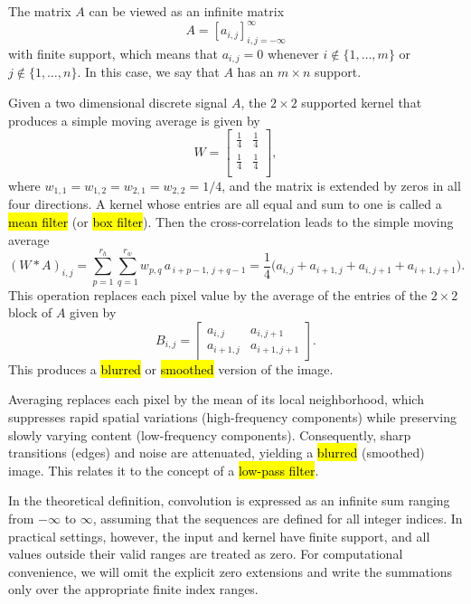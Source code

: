 \begin{remark}
The matrix $A$ can be viewed as an infinite matrix 
$$
A = [a_{i,j}]_{i,j=-\infty}^\infty
$$
with finite support, which means that $a_{i,j}=0$ whenever $i \notin \{1, \ldots, m\}$ or $j \notin \{1, \ldots, n\}$. In this case, we say that $A$ has an $m\times n$ support.
\end{remark}
\begin{example}

Given a two dimensional discrete signal $A$, the $2\times 2$ supported kernel that produces a simple moving average is given by
$$
W = \left[\begin{array}{cccccc}
	\tfrac{1}{4}&\tfrac{1}{4}\\
	\tfrac{1}{4}&\tfrac{1}{4}\\
	\end{array}\right],
$$
where $w_{1,1}=w_{1,2}=w_{2,1}=w_{2,2}=1/4$, and the matrix is extended by zeros in all four directions. A kernel whose entries are all equal and sum to one is called a \hl{mean filter} (or \hl{box filter}).  Then the cross-correlation leads to the simple moving average
$$
(W * A)_{i,j} = \sum_{p=1}^{r_h} \sum_{q=1}^{r_w} 
w_{p,q}\, a_{\,i + p - 1,\, j + q - 1} = \frac{1}{4}\big(a_{i,j} + a_{i+1,j} + a_{i,j+1} + a_{i+1,j+1} \big).
$$
This operation replaces each pixel value by the average of the entries of the $2\times 2$ block of $A$ given by
$$
B_{i,j} =
\begin{bmatrix}
a_{i,j} & a_{i,j+1}\\
a_{i+1,j} & a_{i+1,j+1}
\end{bmatrix}.
$$
This produces a \hl{blurred} or \hl{smoothed} version of the image.

Averaging replaces each pixel by the mean of its local neighborhood, which suppresses rapid spatial variations (high-frequency components) while preserving slowly varying content (low-frequency components). Consequently, sharp transitions (edges) and noise are attenuated, yielding a \hl{blurred} (smoothed) image. This relates it to the concept of a \hl{low-pass filter}.
\end{example}
\begin{note}
In the theoretical definition, convolution is expressed as an infinite sum 
ranging from $-\infty$ to $\infty$, assuming that the sequences are defined for all integer indices.  
In practical settings, however, the input and kernel have finite support, and all values outside their valid ranges are treated as zero.  
For computational convenience, we will omit the explicit zero extensions and write the summations only over the appropriate finite index ranges.
\end{note}
